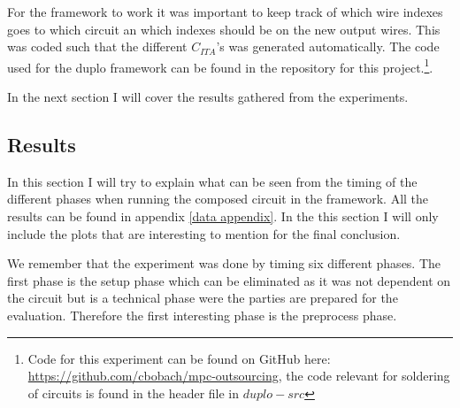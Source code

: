 \documentclass[10pt,a4paper]{article}
\begin{document}
For the framework to work it was important to keep track of which wire indexes goes to which circuit an which indexes should be on the new output wires. This was coded such that the different $C_{ITA}$'s was generated automatically. The code used for the duplo framework can be found in the repository for this project.\footnote{Code for this experiment can be found on GitHub here: \url{https://github.com/cbobach/mpc-outsourcing}, the code relevant for soldering of circuits is found in the header file in $duplo-src$}.

\bigskip
In the next section I will cover the results gathered from the experiments.

\subsection{Results}
\label{results}
In this section I will try to explain what can be seen from the timing of the different phases when running the composed circuit in the framework. All the results can be found in appendix \ref{data appendix}. In the this section I will only include the plots that are interesting to mention for the final conclusion.

We remember that the experiment was done by timing six different phases. The first phase is the setup phase which can be eliminated as it was not dependent on the circuit but is a technical phase were the parties are prepared for the evaluation. Therefore the first interesting phase is the preprocess phase.
\end{document}
